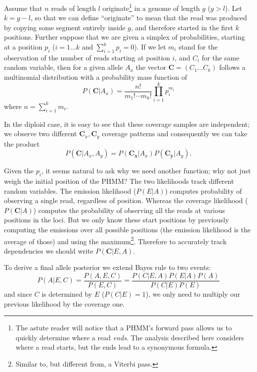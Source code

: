 Assume that $n$ reads of length $l$ originate\footnote{The astute reader will
notice that a PHMM's forward pass allows us to quickly determine where a read
\emph{ends}. The analysis described here considers where a read starts, but the
ends lead to a synonymous formula.}
in a genome of length $g$ ($g>l$).
Let $k=g-l$, so that we can define ``originate'' to mean that the read was produced
by copying some segment entirely inside $g$,
and therefore started in the first $k$ positions.
Further suppose that we are given a simplex of probabilities,
starting at a position $p_{i}$
($i=1\ldots k$ and $\sum_{i=1}^{k}p_{i} = 0$).
If we let $m_{i}$ stand for the observation of the number of reads starting at position $i$,
and $C_{i}$ for the same random variable,
then for a given allele $A_{x}$ the vector $\mathbf{C}=(C_{1} \ldots C_{k})$
follows a multinomial distribution with a probability mass function of
\begin{equation}
  P(\mathbf{C}|A_{x}) = \frac{n!}{m_{1}! \cdots m_{k}!} \prod_{i=1}^{k}p_{i}^{m_{i}}
\end{equation}
where $n=\sum_{i=1}^{k}m_{i}$.

In the diploid case,
it is easy to see that these coverage samples are independent;
we observe two different $\mathbf{C}_{x},\mathbf{C}_{y}$ coverage patterns
and consequently we can take the product
\begin{equation}
  P(\mathbf{C}|A_{x},A_{y}) = P(\mathbf{C_{x}}|A_{x}) P(\mathbf{C_{y}}|A_{y}).
\end{equation}

Given the $p_{i}$, it seems natural to ask why we need another function;
why not just weigh the initial position of the PHMM?
The two likelihoods track different random variables.
The emission likelihood ($P(E|A)$)
computes probability of observing a single read,
regardless of position.
Whereas the coverage likelihood ($P(\mathbf{C}|A)$) computes the probability
of observing all the reads at various positions in the loci.
But we only know these start positions by previously computing the emissions
over all possible positions
(the emission likelihood is the average of those)
and using the maximum\footnote{Similar to, but different from, a Viterbi pass.}.
Therefore to accurately track dependencies we should write
$P(\mathbf{C}|E, A)$.

To derive a final allele posterior we extend Bayes rule to two events:
\begin{equation}
  P(A|E,C) = \frac{P(A,E,C)}{P(E,C)} = \frac{P(C|E,A)P(E|A)P(A)}{P(C|E)P(E)}
\end{equation}
and since $C$ is determined by $E$ ($P(C|E)=1$),
we only need to multiply our previous likelihood by the coverage one.

